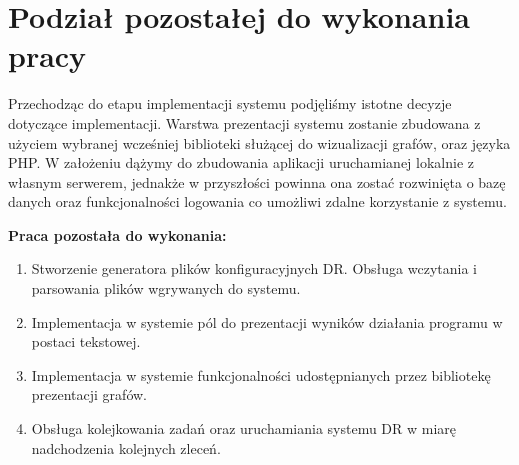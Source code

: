 \chapter{Podział pozostałej do wykonania pracy}
Przechodząc do etapu implementacji systemu podjęliśmy istotne decyzje dotyczące implementacji. Warstwa prezentacji systemu zostanie zbudowana z użyciem wybranej wcześniej biblioteki służącej do wizualizacji grafów, oraz języka PHP. W założeniu dążymy do zbudowania aplikacji uruchamianej lokalnie z własnym serwerem, jednakże w przyszłości powinna ona zostać rozwinięta o bazę danych oraz funkcjonalności logowania co umożliwi zdalne korzystanie z systemu. 


\textbf{Praca pozostała do wykonania:}

\begin{enumerate}
	\item Stworzenie generatora plików konfiguracyjnych DR. Obsługa wczytania i parsowania plików wgrywanych do systemu.
	\item Implementacja w systemie pól do prezentacji wyników działania programu w postaci tekstowej.
	\item Implementacja w systemie funkcjonalności udostępnianych przez bibliotekę prezentacji grafów.
	\item Obsługa kolejkowania zadań oraz uruchamiania systemu DR w miarę nadchodzenia kolejnych zleceń.
\end{enumerate}
